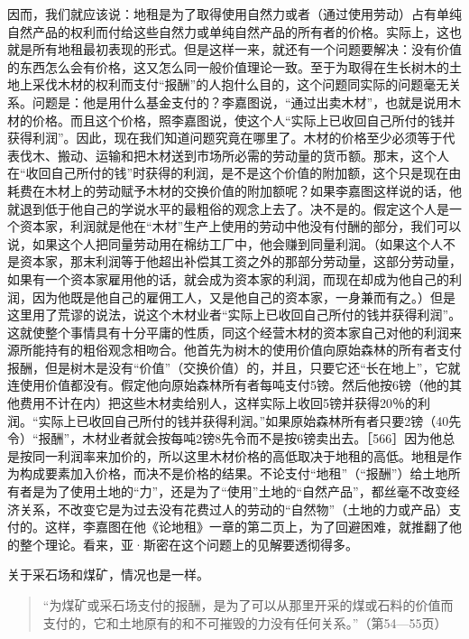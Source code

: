 因而，我们就应该说：地租是为了取得使用自然力或者（通过使用劳动）占有单纯自然产品的权利而付给这些自然力或单纯自然产品的所有者的价格。实际上，这也就是所有地租最初表现的形式。但是这样一来，就还有一个问题要解决：没有价值的东西怎么会有价格，这又怎么同一般价值理论一致。至于为取得在生长树木的土地上采伐木材的权利而支付“报酬”的人抱什么目的，这个问题同实际的问题毫无关系。问题是：他是用什么基金支付的？李嘉图说，“通过出卖木材”，也就是说用木材的价格。而且这个价格，照李嘉图说，使这个人“实际上已收回自己所付的钱并获得利润”。因此，现在我们知道问题究竟在哪里了。木材的价格至少必须等于代表伐木、搬动、运输和把木材送到市场所必需的劳动量的货币额。那末，这个人在“收回自己所付的钱”时获得的利润，是不是这个价值的附加额，这个只是现在由耗费在木材上的劳动赋予木材的交换价值的附加额呢？如果李嘉图这样说的话，他就退到低于他自己的学说水平的最粗俗的观念上去了。决不是的。假定这个人是一个资本家，利润就是他在“木材”生产上使用的劳动中他没有付酬的部分，我们可以说，如果这个人把同量劳动用在棉纺工厂中，他会赚到同量利润。（如果这个人不是资本家，那末利润等于他超出补偿其工资之外的那部分劳动量，这部分劳动量，如果有一个资本家雇用他的话，就会成为资本家的利润，而现在却成为他自己的利润，因为他既是他自己的雇佣工人，又是他自己的资本家，一身兼而有之。）但是这里用了荒谬的说法，说这个木材业者“实际上已收回自己所付的钱并获得利润”。这就使整个事情具有十分平庸的性质，同这个经营木材的资本家自己对他的利润来源所能持有的粗俗观念相吻合。他首先为树木的使用价值向原始森林的所有者支付报酬，但是树木是没有“价值”（交换价值）的，并且，只要它还“长在地上”，它就连使用价值都没有。假定他向原始森林所有者每吨支付5镑。然后他按6镑（他的其他费用不计在内）把这些木材卖给别人，这样实际上收回5镑并获得20％的利润。“实际上已收回自己所付的钱并获得利润。”如果原始森林所有者只要2镑（40先令）“报酬”，木材业者就会按每吨2镑8先令而不是按6镑卖出去。［566］因为他总是按同一利润率来加价的，所以这里木材价格的高低取决于地租的高低。地租是作为构成要素加入价格，而决不是价格的结果。不论支付“地租”（“报酬”）给土地所有者是为了使用土地的“力”，还是为了“使用”土地的“自然产品”，都丝毫不改变经济关系，不改变它是为过去没有花费过人的劳动的“自然物”（土地的力或产品）支付的。这样，李嘉图在他《论地租》一章的第二页上，为了回避困难，就推翻了他的整个理论。看来，亚·斯密在这个问题上的见解要透彻得多。

关于采石场和煤矿，情况也是一样。

\begin{quote}{“为煤矿或采石场支付的报酬，是为了可以从那里开采的煤或石料的价值而支付的，它和土地原有的和不可摧毁的力没有任何关系。”（第54—55页）}\end{quote}

